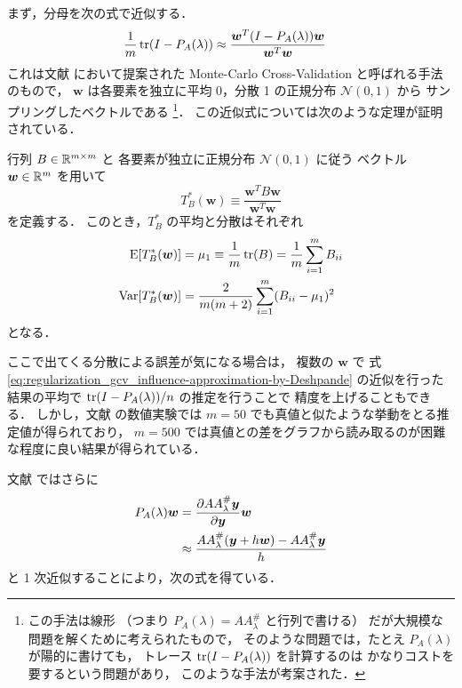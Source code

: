 まず，分母を次の式で近似する．
\begin{align}
    \frac{1}{m} \operatorname{tr}(I - P_A(\lambda))
     & \approx \frac{\bm{w}^T (I - P_A(\lambda)) \bm{w}}{\bm{w}^T \bm{w}}
    \label{eq:regularization_gcv_influence-approximation-by-Deshpande}
\end{align}
これは文献 \cite{Girard1989} において提案された
Monte-Carlo Cross-Validation と呼ばれる手法のもので，
$\bm{w}$ は各要素を独立に平均 0，分散 1 の正規分布 $\mathcal{N}(0,1)$ から
サンプリングしたベクトルである
\footnote{この手法は線形
    （つまり $P_A(\lambda) = A A_\lambda^\#$ と行列で書ける）
    だが大規模な問題を解くために考えられたもので，
    そのような問題では，たとえ $P_A(\lambda)$ が陽的に書けても，
    トレース $\operatorname{tr}(I - P_A(\lambda))$ を計算するのは
    かなりコストを要するという問題があり，
    このような手法が考案された．}．
この近似式については次のような定理が証明されている．

\begin{theorem}
    行列 $B \in \mathbb{R}^{m \times m}$ と
    各要素が独立に正規分布 $\mathcal{N}(0,1)$ に従う
    ベクトル $\bm{w} \in \mathbb{R}^m$ を用いて
    \begin{equation}
        T_B^*(\bm{w}) \equiv \frac{\bm{w}^T B \bm{w}}{\bm{w}^T \bm{w}}
    \end{equation}
    を定義する．
    このとき，$T_B^*$ の平均と分散はそれぞれ
    \begin{align}
        \mathrm{E}[T_B^*(\bm{w})]   & =\mu_1 \equiv \frac{1}{m} \operatorname{tr}(B) = \frac{1}{m} \sum_{i=1}^m B_{ii}
        \\
        \mathrm{Var}[T_B^*(\bm{w})] & =\frac{2}{m (m + 2)} \sum_{i=1}^m (B_{ii} - \mu_1)^2
    \end{align}
    となる．
\end{theorem}

ここで出てくる分散による誤差が気になる場合は，
複数の $\bm{w}$ で
式 \eqref{eq:regularization_gcv_influence-approximation-by-Deshpande} の近似を行った
結果の平均で $\operatorname{tr}(I-P_A(\lambda))/n$ の推定を行うことで
精度を上げることもできる．
しかし，文献 \cite{Girard1989} の数値実験では
$m=50$ でも真値と似たような挙動をとる推定値が得られており，
$m=500$ では真値との差をグラフから読み取るのが困難な程度に良い結果が得られている．

文献 \cite{Deshpande1991} ではさらに
\begin{align}
    P_A(\lambda) \bm{w}
     & = \frac{\partial A A_\lambda^\# \bm{y}}{\partial \bm{y}} \bm{w}
    \notag                                                                   \\
     & \approx \frac{AA_\lambda^\#(\bm{y}+h\bm{w}) - AA_\lambda^\#\bm{y}}{h}
\end{align}
と 1 次近似することにより，次の式を得ている．

